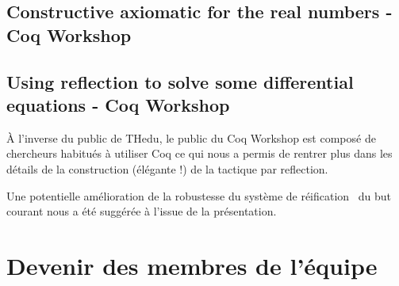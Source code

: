 \documentclass[11pt]{article}
\begin{document}
\subsection{Constructive axiomatic for the real numbers - Coq Workshop}

\subsection{Using reflection to solve some differential equations - Coq Workshop}

À l'inverse du public de THedu, le public du Coq Workshop est composé de chercheurs
habitués à utiliser Coq ce qui nous a permis de rentrer plus dans les détails de la
construction (élégante !) de la tactique par reflection.

Une potentielle amélioration de la robustesse du système de réification~\cite{adhoc}
du but courant nous a été suggérée à l'issue de la présentation.

\section{Devenir des membres de l'équipe}





\end{document}
